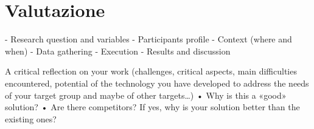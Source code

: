 \section{Valutazione} \label{sec:val}

- Research question and variables
- Participants profile
- Context (where and when)
- Data gathering
- Execution
- Results and discussion


A critical reflection on your work (challenges, critical aspects, main difficulties encountered, potential of the
technology you have developed to address the needs of your target group and maybe of other targets…)
• Why is this a «good» solution?
• Are there competitors? If yes, why is your solution better than the existing ones?